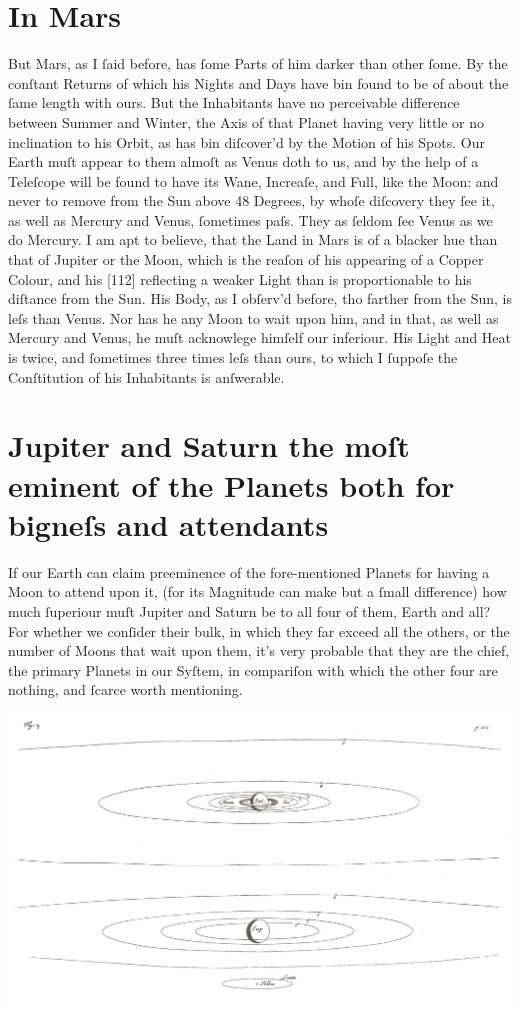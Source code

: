 \documentclass[letterpaper]{book}
\begin{document}
\section{In Mars}

But Mars, as I ſaid before, has ſome Parts of him darker than other ſome.
By the conſtant Returns of which his Nights and Days have bin found to be of
about the ſame length with ours. But the Inhabitants have no perceivable
difference between Summer and Winter, the Axis of that Planet having very
little or no inclination to his Orbit, as has bin diſcover'd by the Motion
of his Spots. Our Earth muſt appear to them almoſt as Venus doth to us, and
by the help of a Teleſcope will be found to have its Wane, Increaſe, and
Full, like the Moon: and never to remove from the Sun above 48 Degrees, by
whoſe diſcovery they ſee it, as well as Mercury and Venus, ſometimes paſs.
They as ſeldom ſee Venus as we do Mercury. I am apt to believe, that the
Land in Mars is of a blacker hue than that of Jupiter or the Moon, which is
the reaſon of his appearing of a Copper Colour, and his [112] reflecting a
weaker Light than is proportionable to his diſtance from the Sun. His Body,
as I obſerv'd before, tho farther from the Sun, is leſs than Venus. Nor has
he any Moon to wait upon him, and in that, as well as Mercury and Venus, he
muſt acknowlege himſelf our inferiour. His Light and Heat is twice, and
ſometimes three times leſs than ours, to which I ſuppoſe the Conſtitution of
his Inhabitants is anſwerable.



\section{Jupiter and Saturn the moſt eminent of the Planets both for bigneſs
and attendants}

If our Earth can claim preeminence of the fore-mentioned Planets for having a Moon to attend upon it, (for its Magnitude can make but a ſmall
difference) how much ſuperiour muſt Jupiter and Saturn be to all four of
them, Earth and all? For whether we conſider their bulk, in which they far
exceed all the others, or the number of Moons that wait upon them, it's very
probable that they are the chief, the primary Planets in our Syſtem, in
compariſon with which the other four are nothing, and ſcarce worth mentioning. 

\begin{center}
	\includegraphics[width=.90\textwidth]{Images/ct_3_en.jpg}
\end{center}
\end{document}
